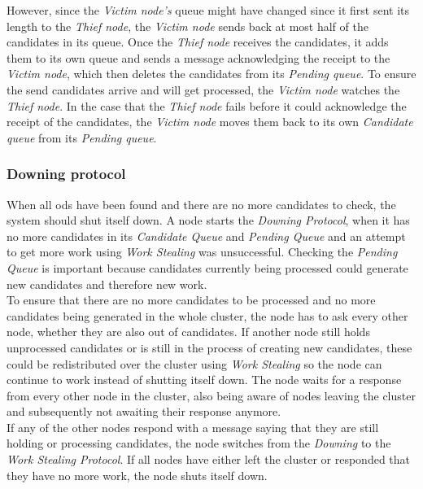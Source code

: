However, since the \emph{Victim node's} queue might have changed since it first sent its length to the \emph{Thief node}, the \emph{Victim node} sends back at most half of the candidates in its queue.
Once the \emph{Thief node} receives the candidates, it adds them to its own queue and sends a message acknowledging the receipt to the \emph{Victim node}, which then deletes the candidates from its \emph{Pending queue}. 
To ensure the send candidates arrive and will get processed, the \emph{Victim node} watches the \emph{Thief node}.
In the case that the \emph{Thief node} fails before it could acknowledge the receipt of the candidates, the \emph{Victim node} moves them back to its own \emph{Candidate queue} from its \emph{Pending queue}.
 
\subsubsection{Downing protocol}\label{protocol:downing}
When all \glspl{od} have been found and there are no more candidates to check, the system should shut itself down.
A node starts the \emph{Downing Protocol}, when it has no more candidates in its \emph{Candidate Queue} and \emph{Pending Queue} and an attempt to get more work using \emph{Work Stealing} was unsuccessful.
Checking the \emph{Pending Queue} is important because candidates currently being processed could generate new candidates and therefore new work.\\
To ensure that there are no more candidates to be processed and no more candidates being generated in the whole cluster, the node has to ask every other node, whether they are also out of candidates.
If another node still holds unprocessed candidates or is still in the process of creating new candidates, these could be redistributed over the cluster using \emph{Work Stealing} so the node can continue to work instead of shutting itself down.
The node waits for a response from every other node in the cluster, also being aware of nodes leaving the cluster and subsequently not awaiting their response anymore.\\
If any of the other nodes respond with a message saying that they are still holding or processing candidates, the node switches from the \emph{Downing} to the \emph{Work Stealing Protocol}.
If all nodes have either left the cluster or responded that they have no more work, the node shuts itself down.

